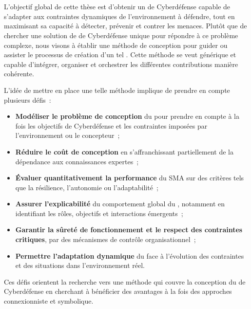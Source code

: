 \

\bigskip

\\

\noindent
L'objectif global de cette thèse est d'obtenir un  de Cyberdéfense capable de s'adapter aux contraintes dynamiques de l'environnement à défendre, tout en maximisant sa capacité à détecter, prévenir et contrer les menaces.
%
Plutôt que de chercher une solution de  de Cyberdéfense unique pour répondre à ce problème complexe, nous visons à établir une méthode de conception pour guider ou assister le processus de création d'un tel . Cette méthode se veut générique et capable d'intégrer, organiser et orchestrer les différentes contributions manière cohérente.

\noindent
L'idée de mettre en place une telle méthode implique de prendre en compte plusieurs défis~:
\begin{itemize}
  \item \textbf{Modéliser le problème de conception} du  pour prendre en compte à la fois les objectifs de Cyberdéfense et les contraintes imposées par l'environnement ou le concepteur~;
  \item \textbf{Réduire le coût de conception} en s'affranchissant partiellement de la dépendance aux connaissances expertes~;
  \item \textbf{Évaluer quantitativement la performance} du SMA sur des critères tels que la résilience, l'autonomie ou l'adaptabilité~;
  \item \textbf{Assurer l'explicabilité} du comportement global du , notamment en identifiant les rôles, objectifs et interactions émergents~;
  \item \textbf{Garantir la sûreté de fonctionnement et le respect des contraintes critiques}, par des mécanismes de contrôle organisationnel~;
  \item \textbf{Permettre l'adaptation dynamique} du  face à l'évolution des contraintes et des situations dans l'environnement réel.
\end{itemize}

\noindent
Ces défis orientent la recherche vers une méthode qui couvre la conception du  de Cyberdéfense en cherchant à bénéficier des avantages à la fois des approches connexionniste et symbolique.

\

\bigskip

\\

